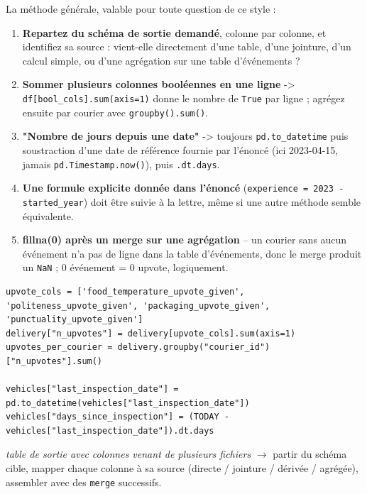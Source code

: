 \documentclass[11pt]{article}
\begin{document}
\begin{explik}
La m\'ethode g\'en\'erale, valable pour toute question de ce style :
\begin{enumerate}[nosep]
  \item \textbf{Repartez du sch\'ema de sortie demand\'e}, colonne par
        colonne, et identifiez sa source : vient-elle directement d'une
        table, d'une jointure, d'un calcul simple, ou d'une agr\'egation
        sur une table d'\'ev\'enements ?
  \item \textbf{Sommer plusieurs colonnes bool\'eennes en une ligne} ->
        \texttt{df[bool\_cols].sum(axis=1)} donne le nombre de
        \texttt{True} par ligne ; agr\'egez ensuite par courier avec
        \texttt{groupby().sum()}.
  \item \textbf{"Nombre de jours depuis une date"} -> toujours
        \texttt{pd.to\_datetime} puis soustraction d'une date de r\'ef\'erence
        fournie par l'\'enonc\'e (ici 2023-04-15, jamais
        \texttt{pd.Timestamp.now()}), puis \texttt{.dt.days}.
  \item \textbf{Une formule explicite donn\'ee dans l'\'enonc\'e}
        (\texttt{experience = 2023 - started\_year}) doit \^etre suivie
        \`a la lettre, m\^eme si une autre m\'ethode semble \'equivalente.
  \item \textbf{fillna(0) apr\`es un merge sur une agr\'egation} -- un
        courier sans aucun \'ev\'enement n'a pas de ligne dans la
        table d'\'ev\'enements, donc le merge produit un \texttt{NaN} ; 0
        \'ev\'enement = 0 upvote, logiquement.
\end{enumerate}
\end{explik}

\begin{lstlisting}
upvote_cols = ['food_temperature_upvote_given', 'politeness_upvote_given', 'packaging_upvote_given', 'punctuality_upvote_given']
delivery["n_upvotes"] = delivery[upvote_cols].sum(axis=1)
upvotes_per_courier = delivery.groupby("courier_id")["n_upvotes"].sum()

vehicles["last_inspection_date"] = pd.to_datetime(vehicles["last_inspection_date"])
vehicles["days_since_inspection"] = (TODAY - vehicles["last_inspection_date"]).dt.days
\end{lstlisting}

\begin{pat}
\emph{\og table de sortie avec colonnes venant de plusieurs fichiers \fg}
$\to$ partir du sch\'ema cible, mapper chaque colonne \`a sa source
(directe / jointure / d\'eriv\'ee / agr\'eg\'ee), assembler avec des
\texttt{merge} successifs.
\end{pat}
\end{document}

